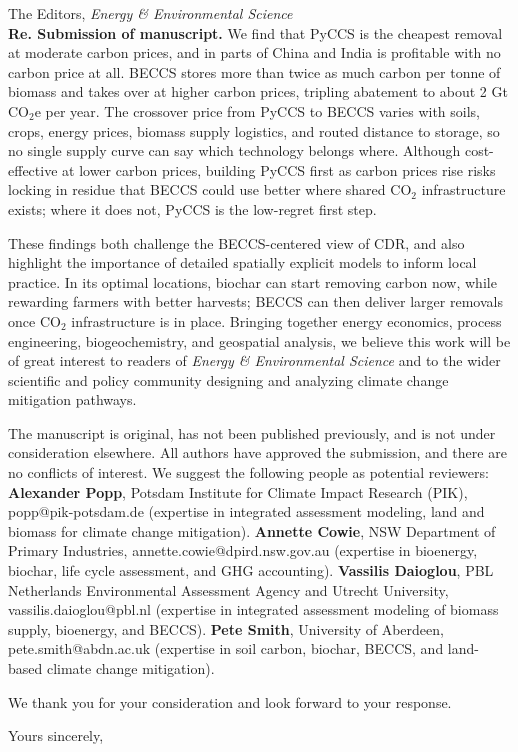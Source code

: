 \begin{letter}{
		The Editors, \emph{Energy \& Environmental Science}\\
	\vspace{0.01\textheight} 
    \textbf{Re.  Submission of manuscript.}
	\vspace{-0.04\textheight} 
}
We find that PyCCS is the cheapest removal at moderate carbon prices, and in parts of China and India is profitable with no carbon price at all. BECCS stores more than twice as much carbon per tonne of biomass and takes over at higher carbon prices, tripling abatement to about 2 Gt CO$_{2}$e per year. The crossover price from PyCCS to BECCS varies with soils, crops, energy prices, biomass supply logistics, and routed distance to storage, so no single supply curve can say which technology belongs where. Although cost-effective at lower carbon prices, building PyCCS first as carbon prices rise risks locking in residue that BECCS could use better where shared CO$_{2}$ infrastructure exists; where it does not, PyCCS is the low-regret first step.

These findings both challenge the BECCS-centered view of CDR, and also highlight the importance of detailed spatially explicit models to inform local practice. In its optimal locations, biochar can start removing carbon now, while rewarding farmers with better harvests; BECCS can then deliver larger removals once CO$_{2}$ infrastructure is in place. Bringing together energy economics, process engineering, biogeochemistry, and geospatial analysis, we believe this work will be of great interest to readers of \emph{Energy \& Environmental Science} and to the wider scientific and policy community designing and analyzing climate change mitigation pathways.

The manuscript is original, has not been published previously, and is not under consideration elsewhere. All authors have approved the submission, and there are no conflicts of interest. We suggest the following people as potential reviewers: \textbf{Alexander Popp}, Potsdam Institute for Climate Impact Research (PIK), popp@pik-potsdam.de (expertise in integrated assessment modeling, land and biomass for climate change mitigation). \textbf{Annette Cowie}, NSW Department of Primary Industries, annette.cowie@dpird.nsw.gov.au (expertise in bioenergy, biochar, life cycle assessment, and GHG accounting). \textbf{Vassilis Daioglou}, PBL Netherlands Environmental Assessment Agency and Utrecht University, vassilis.daioglou@pbl.nl (expertise in integrated assessment modeling of biomass supply, bioenergy, and BECCS). \textbf{Pete Smith}, University of Aberdeen, pete.smith@abdn.ac.uk (expertise in soil carbon, biochar, BECCS, and land-based climate change mitigation).

We thank you for your consideration and look forward to your response.

\closing{Yours sincerely,}

\end{letter}

